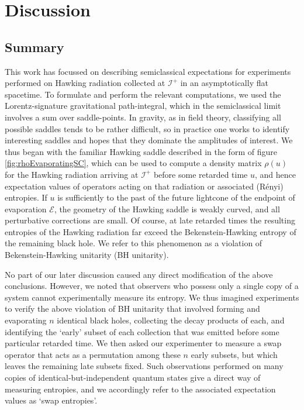 \documentclass[letterpaper,12pt]{article}
\newcommand*{\scri}{\mathscr{I}} %
\newcommand*{\evap}{\mathscr{E}} %
\begin{document}
\section{Discussion}
\label{sec:Disc}

\subsection{Summary}\label{sec:summary}

This work has focussed on describing semiclassical expectations for experiments performed on Hawking radiation collected at $\scri^+$ in an asymptotically flat spacetime. To formulate and perform the relevant computations, we used the Lorentz-signature gravitational path-integral, which in the semiclassical limit involves a sum over saddle-points.  In gravity, as in field theory, classifying all possible saddles tends to be rather difficult, so in practice one works to identify interesting saddles and hopes that they dominate the amplitudes of interest.  We thus began with the familiar Hawking saddle described in the form of figure \ref{fig:rhoEvaporatingSC}, which can be used to compute a density matrix $\rho(u)$ for the Hawking radiation arriving at $\scri^+$ before some retarded time $u$, and hence expectation values of operators acting on that radiation or associated (R\'enyi) entropies. If $u$ is sufficiently to the past of the future lightcone of the endpoint of evaporation $\evap$, the geometry of the Hawking saddle is weakly curved, and all perturbative corrections are small. Of course, at late retarded times the resulting entropies of the Hawking radiation far exceed the Bekenstein-Hawking entropy of the remaining black hole.  We refer to this phenomenon as a violation of Bekenstein-Hawking unitarity (BH unitarity).

No part of our later discussion caused any direct modification of the above conclusions. However, we noted that observers who possess only a single copy of a system cannot experimentally measure its entropy.  We thus imagined experiments to verify the above violation of BH unitarity that involved forming and evaporating $n$ identical black holes, collecting the decay products of each, and identifying the `early' subset of each collection that was emitted before some particular retarded time. We then asked our experimenter to measure a swap operator that acts as a permutation among these $n$ early subsets, but which leaves the remaining late subsets fixed. Such observations performed on many copies of identical-but-independent quantum states give a direct way of measuring entropies, and we accordingly refer to the associated expectation values as `swap entropies'.
\end{document}
